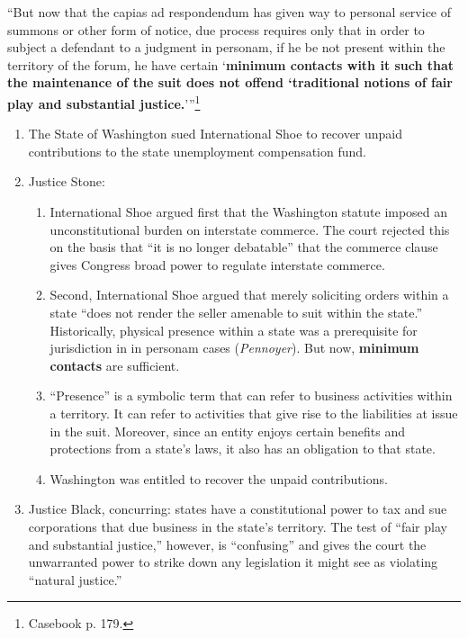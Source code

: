 \enquote{But now that the capias ad respondendum has given way to personal 
service of summons or other form of notice, due process requires only that in 
order to subject a defendant to a judgment in personam, if he be not present 
within the territory of the forum, he have certain \enquote{\textbf{minimum 
contacts with it such that the maintenance of the suit does not offend 
`traditional notions of fair play and substantial 
justice.}}}\footnote{Casebook p. 179.}
\begin{enumerate}
    \item The State of Washington sued International Shoe to recover unpaid 
    contributions to the state unemployment compensation fund.
    \item Justice Stone:
    \begin{enumerate}
        \item International Shoe argued first that the Washington statute 
        imposed an unconstitutional burden on interstate commerce. The court 
        rejected this on the basis that ``it is no longer debatable'' that the 
        commerce clause gives Congress broad power to regulate interstate 
        commerce.
        \item Second, International Shoe argued that merely soliciting orders 
        within a state ``does not render the seller amenable to suit within 
        the state.'' Historically, physical presence within a state was a 
        prerequisite for jurisdiction in in personam cases (\emph{Pennoyer}). 
        But now, \textbf{minimum contacts} are sufficient.
        \item ``Presence'' is a symbolic term that can refer to business 
        activities within a territory.  It can refer to activities that give 
        rise to the liabilities at issue in the suit. Moreover, since an 
        entity enjoys certain benefits and protections from a state's laws, it 
        also has an obligation to that state.
        \item Washington was entitled to recover the unpaid contributions.
    \end{enumerate}
    \item Justice Black, concurring: states have a constitutional power to tax 
    and sue corporations that due business in the state's territory. The test 
    of ``fair play and substantial justice,'' however, is ``confusing'' and 
    gives the court the unwarranted power to strike down any legislation it 
    might see as violating ``natural justice.''
\end{enumerate}

